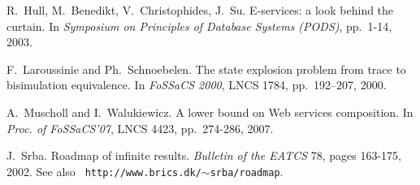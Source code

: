 \documentclass{LMCS}
\theoremstyle{plain}\newtheorem{remark}{Remark}
\theoremstyle{plain}\newtheorem{lemma}[thm]{Lemma}
\begin{document}
\begin{thebibliography}{1}
R.~Hull, M.~Benedikt, V.~Christophides, J.~Su.
\newblock E-services: a look behind the curtain. 
\newblock In \emph{Symposium on Principles of Database Systems
    (PODS)}, pp.~1-14, 2003.

F.~Laroussinie and {\relax Ph}.~Schnoebelen.
\newblock The state explosion problem from trace to bisimulation equivalence.
\newblock In {\em FoSSaCS 2000}, LNCS 1784, pp.~192--207, 2000.

A.~Muscholl and I.~Walukiewicz. 
\newblock A lower bound on Web services composition.
\newblock In \emph{Proc. of FoSSaCS'07}, LNCS 4423, pp.~274-286, 2007.

J.~Srba.
\newblock Roadmap of infinite results.
\newblock \emph{Bulletin of the EATCS} 78, pages 163-175, 2002. See
also \texttt{ http://www.brics.dk/$\sim$srba/roadmap}.



\end{thebibliography}
\end{document}
